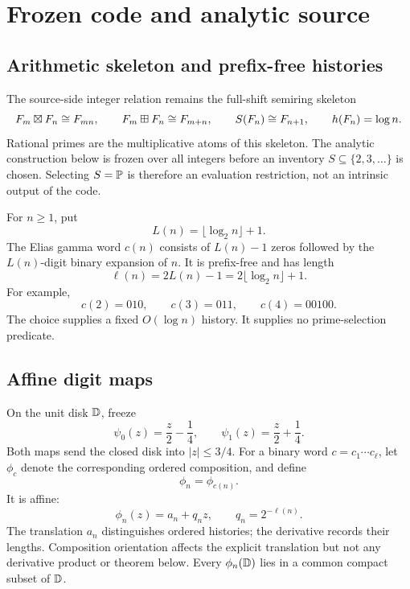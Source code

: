 \section{Frozen code and analytic source}
\label{sec:source}

\subsection{Arithmetic skeleton and prefix-free histories}

The source-side integer relation remains the full-shift semiring skeleton
\[
 F_m\mathbin{\boxtimes} F_n\cong F_{mn},\qquad
 F_m\mathbin{\boxplus} F_n\cong F_{m+n},\qquad
 S(F_n)\cong F_{n+1},\qquad h(F_n)=\log n.
\]
Rational primes are the multiplicative atoms of this skeleton.  The
analytic construction below is frozen over all integers before an inventory
\(S\subseteq\{2,3,\ldots\}\) is chosen.  Selecting \(S=\mathbb P\) is therefore
an evaluation restriction, not an intrinsic output of the code.

For \(n\ge1\), put
\[
 L(n)=\lfloor\log_2n\rfloor+1.
\]
The Elias gamma word \(c(n)\) consists of \(L(n)-1\) zeros followed by the
\(L(n)\)-digit binary expansion of \(n\).  It is prefix-free and has length
\begin{equation}
 \ell(n)=2L(n)-1=2\lfloor\log_2n\rfloor+1.
 \label{eq:gamma-length}
\end{equation}
For example,
\[
 c(2)=010,\qquad c(3)=011,\qquad c(4)=00100.
\]
The choice supplies a fixed \(O(\log n)\) history.  It supplies no
prime-selection predicate.

\subsection{Affine digit maps}

On the unit disk \(\mathbb D\), freeze
\begin{equation}
 \psi_0(z)=\frac z2-\frac14,
 \qquad
 \psi_1(z)=\frac z2+\frac14.
 \label{eq:digit-maps}
\end{equation}
Both maps send the closed disk into \(|z|\le3/4\).  For a binary word
\(c=c_1\cdots c_\ell\), let \(\phi_c\) denote the corresponding ordered
composition, and define
\[
        \phi_n=\phi_{c(n)}.
\]
It is affine:
\begin{equation}
        \phi_n(z)=a_n+q_nz,
        \qquad q_n=2^{-\ell(n)}.
 \label{eq:code-branch}
\end{equation}
The translation \(a_n\) distinguishes ordered histories; the derivative
records their lengths.  Composition orientation affects the explicit
translation but not any derivative product or theorem below.  Every
\(\phi_n(\mathbb D)\) lies in a common compact subset of \(\mathbb D\).

